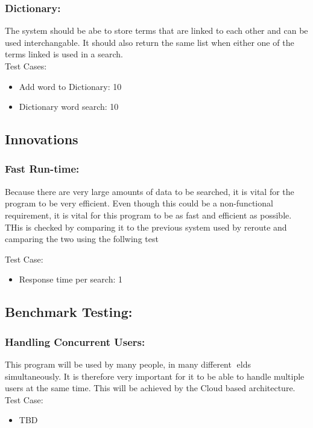\documentclass[11pt]{article}
\begin{document}
	\subsubsection{Dictionary: }
	The system should be abe to store terms that are linked to each other and can be used interchangable. It should also return the same list when either one of the terms linked is used in a search.\\
	Test Cases:
	 \begin{itemize}
	 \item Add word to Dictionary: 10
	 \item Dictionary word search: 10
        \end{itemize}
	
	\subsection{Innovations}
	\subsubsection{Fast Run-time:}
Because there are very large amounts of data to be searched, it is vital for the program to be very
efficient. Even though this could be a non-functional requirement, it is vital for this program to be as fast
and efficient as possible. THis is checked by comparing it to the previous system used by reroute and camparing the two using the follwing test

	Test Case:
	\begin{itemize}	
        \item Response time per search: 1 
         \end{itemize}
         
	\subsection{Benchmark Testing:}

	\subsubsection{Handling Concurrent Users:}
This program will be used by many people, in many different elds simultaneously. It is therefore very important for it to be able to handle multiple users
at the same time. This will be achieved by the Cloud based architecture.	
	Test Case:
	\begin{itemize}
        	\item TBD 
       \end{itemize}
\end{document}
